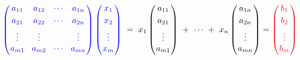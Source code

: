 {\begin{frame}
\begin{columns}[c]
\begin{column}{1.15\textwidth}
\[
{\color{blue}
\left(
\begin{array}{@{\hspace{0.1\tabcolsep}}c@{\hspace{1.5\tabcolsep}}c@{\hspace{1.5\tabcolsep}}c@{\hspace{1.5\tabcolsep}}c@{\hspace{0.1\tabcolsep}}}
a_{11} & a_{12} & \cdots & a_{1n} \\[1mm]
a_{21} & a_{22} & \cdots & a_{2n} \\[1mm]
\vdots & \vdots &        & \vdots \\[0mm]
a_{m1} & a_{m2} & \cdots & a_{mn} \\[1mm]
\end{array}
\right)
\left(
\begin{array}{@{\hspace{0.1\tabcolsep}}c@{\hspace{0.1\tabcolsep}}}
x_{1} \\[1mm]
x_{2} \\[1mm]
\vdots \\[0mm]
x_{m} \\[1mm]
\end{array}
\right)}\ 
=\ 
x_1
\left(
\begin{array}{@{\hspace{0.1\tabcolsep}}c@{\hspace{0.1\tabcolsep}}}
a_{11} \\[1mm]
a_{21} \\[1mm]
\vdots \\[0mm]
a_{m1} \\[1mm]
\end{array}
\right)\ 
+\ 
\cdots\ 
+\ 
x_n
\left(
\begin{array}{@{\hspace{0.1\tabcolsep}}c@{\hspace{0.1\tabcolsep}}}
a_{1n} \\[1mm]
a_{2n} \\[1mm]
\vdots \\[0mm]
a_{mn} \\[1mm]
\end{array}
\right)
=
{\color{red}
\left(
\begin{array}{@{\hspace{0.1\tabcolsep}}c@{\hspace{0.1\tabcolsep}}}
b_{1} \\[1mm]
b_{2} \\[1mm]
\vdots \\[0mm]
b_{m} \\[1mm]
\end{array}
\right)
}
\]


\end{column}
\end{columns}
\end{frame}}
